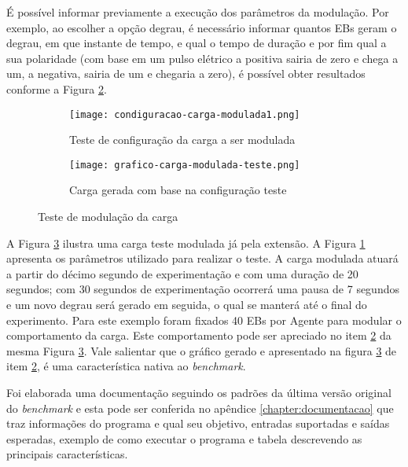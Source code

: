 É possível informar previamente a execução dos parâmetros da modulação. Por exemplo, ao escolher a opção degrau, é necessário informar quantos EBs geram o degrau, em que instante de tempo, e qual o tempo de duração e por fim qual a sua polaridade (com base em um pulso elétrico a positiva sairia de zero e chega a um, a negativa, sairia de um e chegaria a zero), é possível obter resultados conforme a Figura \ref{fig:grafico-carga-modulada-teste}.

\begin{figure}[!htb]
	\centering
	\begin{subfigure}{\linewidth}
		\centering
		\texttt{[image: condiguracao-carga-modulada1.png]}
		\caption{Teste de configuração da carga a ser modulada}
		\label{fig:configuracao-carga-modulada-teste}
	\end{subfigure}
	
	\begin{subfigure}{\linewidth}
		\centering
		\texttt{[image: grafico-carga-modulada-teste.png]}
		\caption{Carga gerada com base na configuração teste}
		\label{fig:grafico-carga-modulada-teste}
	\end{subfigure}  
	\caption{Teste de modulação da carga}  
	\label{fig:carga-modulada-teste}
	\fautor
\end{figure}  

A Figura \ref{fig:carga-modulada-teste} ilustra uma carga teste modulada já pela extensão. A Figura \ref{fig:configuracao-carga-modulada-teste} apresenta os parâmetros utilizado para realizar o teste. A carga modulada atuará a partir do décimo segundo de experimentação e com uma duração de 20 segundos; com 30 segundos de experimentação ocorrerá uma pausa de 7 segundos e um novo degrau será gerado em seguida, o qual se manterá até o final do experimento. Para este exemplo foram fixados 40 EBs por Agente para modular o comportamento da carga. Este comportamento pode ser apreciado no item \ref{fig:grafico-carga-modulada-teste} da mesma Figura \ref{fig:carga-modulada-teste}. Vale salientar que o gráfico gerado e apresentado na figura \ref{fig:carga-modulada-teste} de item \ref{fig:grafico-carga-modulada-teste}, é uma característica nativa ao \textit{benchmark}.



Foi elaborada uma documentação seguindo os padrões da última versão original do \textit{benchmark} e esta pode ser conferida no apêndice \ref{chapter:documentacao} que traz informações do programa e qual seu objetivo, entradas suportadas e saídas esperadas, exemplo de como executar o programa e tabela descrevendo as principais características.

